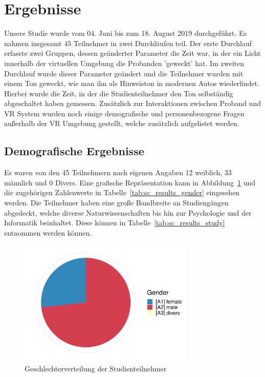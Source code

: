 \section{Ergebnisse}

Unsere Studie wurde vom 04. Juni bis zum 18. August 2019 durchgeführt. Es nahmen insgesamt 45 Teilnehmer in zwei Durchläufen teil. Der erste Durchlauf erfasste zwei Gruppen, dessen geänderter Parameter die Zeit war, in der ein Licht innerhalb der virtuellen Umgebung die Probanden 'geweckt' hat. Im zweiten Durchlauf wurde dieser Parameter geändert und die Teilnehmer wurden mit einem Ton geweckt, wie man ihn als Hinweiston in modernen Autos wiederfindet. Hierbei wurde die Zeit, in der die Studienteilnehmer den Ton selbständig abgeschaltet haben gemessen. Zusätzlich zur Interaktionen zwischen Proband und VR System wurden noch einige demografische und personenbezogene Fragen außerhalb der VR Umgebung gestellt, welche zusätzlich aufgelistet werden.

\subsection{Demografische Ergebnisse}

Es waren von den 45 Teilnehmern nach eigenen Angaben 12 weiblich, 33 männlich und 0 Divers. Eine grafische Repräsentation kann in Abbildung~\ref{fig:gender} und die zugehörigen Zahlenwerte in Tabelle~\ref{tab:sc_results_gender} eingesehen werden. Die Teilnehmer haben eine große Bandbreite an Studiengängen abgedeckt, welche diverse Naturwissenschaften bis hin zur Psychologie und der Informatik beinhaltet. Diese können in Tabelle~\ref{tab:sc_results_study} entnommen werden können.

\begin{figure}[H]
	\centering
	\includegraphics[width=0.75\textwidth]{./_StudyResults/gender}
	\caption{Geschlechterverteilung der Studienteilnehmer}
	\label{fig:gender}
\end{figure}

